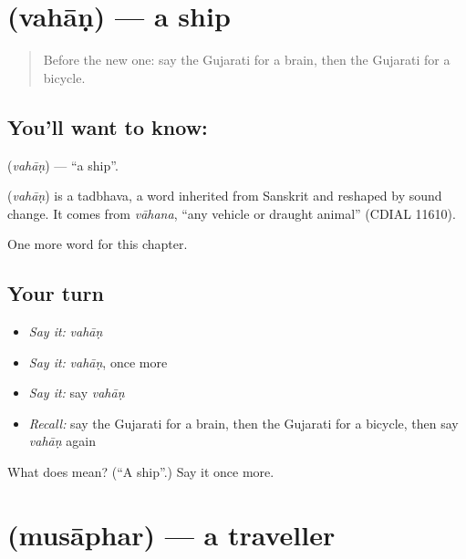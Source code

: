 \section[\texorpdfstring{\gu{વહાણ} (vahāṇ)}{વહાણ (vahāṇ)}]{ (vahāṇ) — a ship}

\label{lesson:GU-C127-vahan}



\begin{quote}
Before the new one: say the Gujarati for a brain, then the Gujarati for a bicycle.
\end{quote}

\subsection*{You'll want to know: }
\textbf{} (\emph{vahāṇ}) — \textquotedblleft{}a ship\textquotedblright{}.

\begin{cousinweb}
\textbf{} (\emph{vahāṇ}) is a tadbhava, a word inherited from Sanskrit and reshaped by sound change. It comes from \emph{vāhana}, \textquotedblleft{}any vehicle or draught animal\textquotedblright{} (CDIAL 11610).
\end{cousinweb}

\begin{grammarlens}[title={What you've built}]
One more word for this chapter.
\end{grammarlens}

\subsection*{Your turn}
\begin{itemize}
\raggedright
  \item \emph{Say it:} \emph{vahāṇ}
  \item \emph{Say it:} \emph{vahāṇ}, once more
  \item \emph{Say it:} say \emph{vahāṇ}
  \item \emph{Recall:} say the Gujarati for a brain, then the Gujarati for a bicycle, then say \emph{vahāṇ} again
\end{itemize}

\begin{tcolorbox}[breakable,colback=teal!4,colframe=teal!35!black,title={Before you move on}]
What does  mean? (\textquotedblleft{}A ship\textquotedblright{}.) Say it once more.
\end{tcolorbox}
\section[\texorpdfstring{\gu{મુસાફર} (musāphar)}{મુસાફર (musāphar)}]{ (musāphar) — a traveller}


